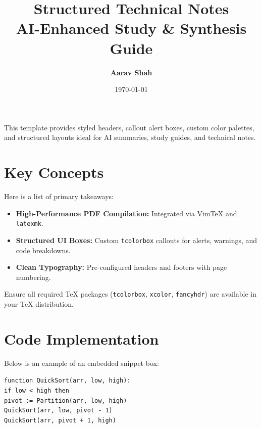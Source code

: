 \documentclass[11pt,a4paper]{article}
\title{\textcolor{primary}{\Huge \textbf{Structured Technical Notes}}\\[0.3em] \large \textcolor{secondary}{AI-Enhanced Study \& Synthesis Guide}}
\author{\textbf{Aarav Shah}}
\date{\today}
\begin{document}
\maketitle

\begin{infobox}
This template provides styled headers, callout alert boxes, custom color palettes, and structured layouts ideal for AI summaries, study guides, and technical notes.
\end{infobox}

\section{Key Concepts}
Here is a list of primary takeaways:

\begin{itemize}[label=\textcolor{secondary}{$\bullet$}]
    \item \textbf{High-Performance PDF Compilation:} Integrated via VimTeX and \texttt{latexmk}.
    \item \textbf{Structured UI Boxes:} Custom \texttt{tcolorbox} callouts for alerts, warnings, and code breakdowns.
    \item \textbf{Clean Typography:} Pre-configured headers and footers with page numbering.
\end{itemize}

\begin{warningbox}
Ensure all required TeX packages (\texttt{tcolorbox}, \texttt{xcolor}, \texttt{fancyhdr}) are available in your TeX distribution.
\end{warningbox}

\section{Code Implementation}
Below is an example of an embedded snippet box:

\begin{infobox}
\texttt{function QuickSort(arr, low, high):}\\
\hspace*{1em}\texttt{if low < high then}\\
\hspace*{2em}\texttt{pivot := Partition(arr, low, high)}\\
\hspace*{2em}\texttt{QuickSort(arr, low, pivot - 1)}\\
\hspace*{2em}\texttt{QuickSort(arr, pivot + 1, high)}
\end{infobox}
\end{document}
